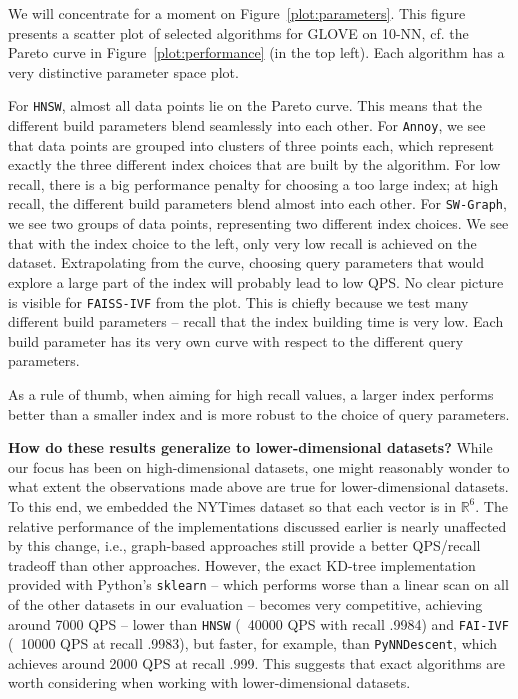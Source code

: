 We will concentrate for a moment on Figure~\ref{plot:parameters}. This figure presents a scatter plot of selected algorithms for \textsf{GLOVE} on 10-NN, cf. the Pareto curve in Figure~\ref{plot:performance} (in the top left). Each algorithm has a very distinctive parameter space plot. 

For \texttt{HNSW}, almost all data points lie on the Pareto curve. This means that the different build parameters blend seamlessly into each other.
For \texttt{Annoy}, we see that data points are grouped into clusters of three points each, which represent exactly the three different index
choices that are built by the algorithm.
For low recall, there is a big performance penalty for choosing a too large index; at high recall, the different build parameters blend almost into each other.
For \texttt{SW-Graph}, we see two groups of data points, representing two different index choices.
We see that with the index choice to the left, only very low recall is achieved on the dataset.
Extrapolating from the curve, choosing query parameters that would explore a large part of the index will probably lead to low QPS. No clear picture is visible for \texttt{FAISS-IVF} from the plot. This is chiefly because we test many different build parameters -- recall that the index building time is very low. Each build parameter has its very own curve with respect to the different query parameters. 

As a rule of thumb, when aiming for high recall values, a larger index performs
better than a smaller index and is more robust to the choice of query parameters.

\begin{figure}
    
\end{figure}

\medskip
\noindent\textbf{How do these results generalize to lower-dimensional datasets?} While our focus has been on high-dimensional datasets, one might reasonably wonder to what extent the observations made above are true for lower-dimensional datasets. To this end, we embedded the \textsf{NYTimes} dataset so that each vector is in $\mathbb{R}^6$. The relative performance of the implementations discussed earlier is nearly unaffected by this change, i.e., graph-based approaches still provide a better QPS/recall tradeoff than other approaches. However, the exact KD-tree
implementation provided with Python's \texttt{sklearn} --
which performs worse than a linear scan on all of the other datasets in our evaluation --
becomes very competitive, achieving around 7000 QPS -- lower than \texttt{HNSW} (~40000 QPS with recall .9984) and \texttt{FAI-IVF} (~10000 QPS at recall .9983), but faster, for example, than \texttt{PyNNDescent}, which achieves around 2000 QPS at recall .999.
This suggests that exact algorithms are worth considering when working with lower-dimensional datasets.
